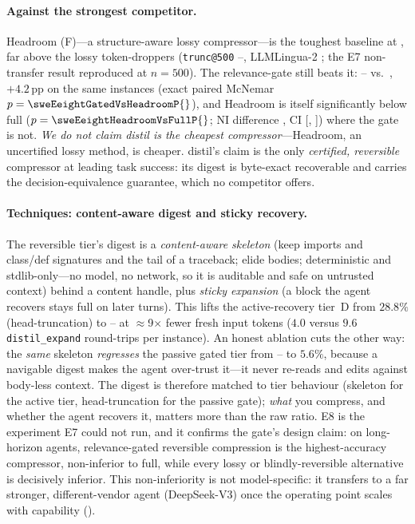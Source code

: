 \documentclass{article}
\newcommand{\sweEeightN}{500}\newcommand{\sweEeightSeed}{1729}%
\newcommand{\sweEeightDistilPass}{--}\newcommand{\sweEeightDistilResolved}{--}%
\newcommand{\sweEeightExpandPass}{--}\newcommand{\sweEeightExpandResolved}{--}%
\newcommand{\sweEeightGatedPass}{--}\newcommand{\sweEeightGatedResolved}{--}%
\begin{document}
\paragraph{Against the strongest competitor.} Headroom (F)---a structure-aware lossy
compressor---is the toughest baseline at \sweEeightHeadroomPass{}, far above the lossy
token-droppers (\texttt{trunc@500} \sweEeightDistilPass{}, LLMLingua-2 \sweEeightLinguaPass{};
the E7 non-transfer result reproduced at $n=\sweEeightN{}$). The relevance-gate still beats
it: \sweEeightGatedPass{} vs.\ \sweEeightHeadroomPass{}, $+4.2$\,pp on the same instances
(exact paired McNemar $p=\sweEeightGatedVsHeadroomP{}$), and Headroom is itself significantly
below full ($p=\sweEeightHeadroomVsFullP{}$; NI difference \sweEeightHeadroomNIDelta{}, CI
[\sweEeightHeadroomNICIlo, \sweEeightHeadroomNICIhi]) where the gate is not. \emph{We do not
claim distil is the cheapest compressor}---Headroom, an uncertified lossy method, is cheaper.
distil's claim is the only \emph{certified, reversible} compressor at leading task success:
its digest is byte-exact recoverable and carries the decision-equivalence guarantee, which
no competitor offers.

\paragraph{Techniques: content-aware digest and sticky recovery.} The reversible tier's
digest is a \emph{content-aware skeleton} (keep imports and class/def signatures and the
tail of a traceback; elide bodies; deterministic and stdlib-only---no model, no network, so
it is auditable and safe on untrusted context) behind a content handle, plus \emph{sticky
expansion} (a block the agent recovers stays full on later turns). This lifts the
active-recovery tier~D from $28.8\%$ (head-truncation) to \sweEeightExpandPass{} at
$\approx$9$\times$ fewer fresh input tokens ($4.0$ versus $9.6$ \texttt{distil\_expand}
round-trips per instance). An honest ablation cuts the other way: the \emph{same} skeleton
\emph{regresses} the passive gated tier from \sweEeightGatedPass{} to $5.6\%$, because a
navigable digest makes the agent over-trust it---it never re-reads and edits against
body-less context. The digest is therefore matched to tier behaviour (skeleton for the
active tier, head-truncation for the passive gate); \emph{what} you compress, and whether the
agent recovers it, matters more than the raw ratio. E8 is the experiment E7 could not run,
and it confirms the gate's design claim: on long-horizon agents, relevance-gated reversible
compression is the highest-accuracy compressor, non-inferior to full, while every lossy or
blindly-reversible alternative is decisively inferior. This non-inferiority is not
model-specific: it transfers to a far stronger, different-vendor agent (DeepSeek-V3) once the
operating point scales with capability ().
\end{document}
